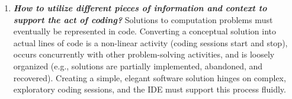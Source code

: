 \begin{enumerate}
\item \textit{\textbf{How to utilize different pieces of information and context to support the act of coding?}}
Solutions to computation problems must eventually be represented in code.
Converting a conceptual solution into actual lines of code is a non-linear activity (coding sessions start and stop), occurs concurrently with other problem-solving activities, and is loosely organized (e.g., solutions are partially implemented, abandoned, and recovered).
Creating a simple, elegant software solution hinges on complex, exploratory coding sessions, and the IDE must support this process fluidly.

\end{enumerate}